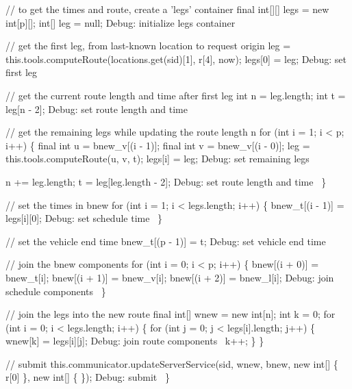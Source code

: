   // to get the times and route, create a 'legs' container
  final int[][] legs = new int[p][];
  int[] leg = null;
  \LA{}Debug: initialize legs container~{\nwtagstyle{}}\RA{}

  // get the first leg, from last-known location to request origin
  leg = this.tools.computeRoute(locations.get(sid)[1], r[4], now);
  legs[0] = leg;
  \LA{}Debug: set first leg~{\nwtagstyle{}}\RA{}

  // get the current route length and time after first leg
  int n = leg.length;
  int t = leg[n - 2];
  \LA{}Debug: set route length and time~{\nwtagstyle{}}\RA{}

  // get the remaining legs while updating the route length n
  for (int i = 1; i < p; i++) \{
    final int u = bnew_v[(i - 1)];
    final int v = bnew_v[(i - 0)];
    leg = this.tools.computeRoute(u, v, t);
    legs[i] = leg;
    \LA{}Debug: set remaining legs~{\nwtagstyle{}}\RA{}

    n += leg.length;
    t = leg[leg.length - 2];
    \LA{}Debug: set route length and time~{\nwtagstyle{}}\RA{}
  \}

  // set the times in bnew
  for (int i = 1; i < legs.length; i++) \{
    bnew_t[(i - 1)] = legs[i][0];
    \LA{}Debug: set schedule time~{\nwtagstyle{}}\RA{}
  \}

  // set the vehicle end time
  bnew_t[(p - 1)] = t;
  \LA{}Debug: set vehicle end time~{\nwtagstyle{}}\RA{}

  // join the bnew components
  for (int i = 0; i < p; i++) \{
    bnew[(i + 0)] = bnew_t[i];
    bnew[(i + 1)] = bnew_v[i];
    bnew[(i + 2)] = bnew_l[i];
    \LA{}Debug: join schedule components~{\nwtagstyle{}}\RA{}
  \}

  // join the legs into the new route
  final int[] wnew = new int[n];
  int k = 0;
  for (int i = 0; i < legs.length; i++) \{
    for (int j = 0; j < legs[i].length; j++) \{
      wnew[k] = legs[i][j];
      \LA{}Debug: join route components~{\nwtagstyle{}}\RA{}
      k++;
    \}
  \}

  // submit
  this.communicator.updateServerService(sid, wnew, bnew,
      new int[] \{ r[0] \}, new int[] \{ \});
  \LA{}Debug: submit~{\nwtagstyle{}}\RA{}
\}
\nwendcode{}\nwdocspar

